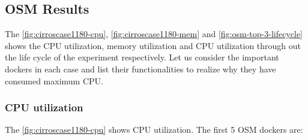 \subsection{OSM Results}
The \ref{fig:cirroscase1180-cpu}, \ref{fig:cirroscase1180-mem} and \ref{fig:osm-top-3-lifecycle} shows the CPU utilization, memory utilization and CPU utilization through out the life cycle of the experiment respectively. Let us consider the important dockers in each case and list their functionalities to realize why they have consumed maximum CPU.

\subsubsection{CPU utilization}

The \ref{fig:cirroscase1180-cpu} shows CPU utilization. The first 5 OSM dockers are:

